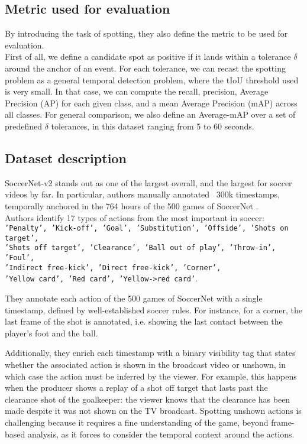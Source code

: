 \documentclass{article}
\begin{document}
\subsection{Metric used for evaluation}
By introducing the task of spotting, they also define the metric to be used for evaluation. \\
First of all, we define a candidate spot as positive if it lands within a tolerance $\delta$ around the anchor of an event. For each tolerance, we can recast the spotting problem as a general temporal detection problem, where the tIoU threshold used is very small. In that case, we can compute the recall, precision, Average Precision (AP) for each given class, and a mean Average Precision (mAP) across all classes. For general comparison, we also define an Average-mAP over a set of predefined $\delta$ tolerances, in this dataset ranging from 5 to 60 seconds.

\subsection{Dataset description}
SoccerNet-v2 stands out as one of the largest overall, and the largest for soccer videos by far. In particular, authors manually annotated ~300k timestamps, temporally anchored in the 764 hours of the 500 games of SoccerNet \cite{sn-v1}. 
\\
Authors identify 17 types of actions from the most important in soccer: 
\\
\texttt{'Penalty', 'Kick-off', 'Goal', 'Substitution', 'Offside', 'Shots on target',\\
'Shots off target', 'Clearance', 'Ball out of play', 'Throw-in', 'Foul',\\
'Indirect free-kick', 'Direct free-kick', 'Corner',\\
'Yellow card', 'Red card', 'Yellow->red card'}.

They annotate each action of the 500 games of SoccerNet with a single timestamp, defined by well-established soccer rules. For instance, for a corner, the last frame of the shot is annotated, i.e. showing the last contact between the player’s foot and the ball. 

Additionally, they enrich each timestamp with a binary visibility tag that states whether the associated action is shown in the broadcast video or unshown, in which case the action must be inferred by the viewer. For example, this happens when the producer shows a replay of a shot off target that lasts past the clearance shot of the goalkeeper: the viewer knows that the clearance has been made despite it was not shown on the TV broadcast. Spotting unshown actions is challenging because it requires a fine understanding of the game, beyond frame-based analysis, as it forces to consider the temporal context around the actions. 
\end{document}
